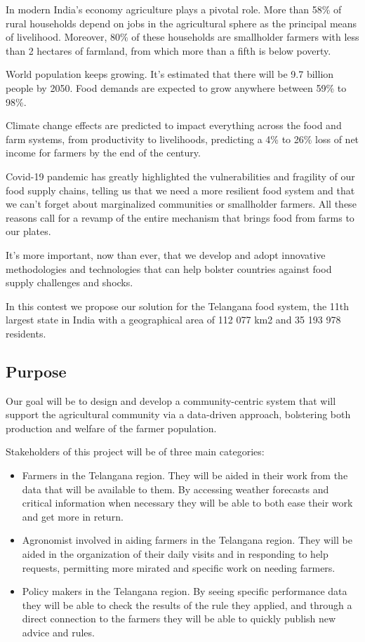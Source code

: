 \documentclass{article}
\begin{document}
In modern India’s economy agriculture plays a pivotal role. More than 58\% of rural households depend on jobs in the agricultural sphere as the principal means of livelihood. Moreover, 80\% of these households are smallholder farmers with less than 2 hectares of farmland, from which more than a fifth is below poverty. \par
World population keeps growing. It’s estimated that there will be 9.7 billion people by 2050. Food demands are expected to grow anywhere between 59\% to 98\%. \par
Climate change effects are predicted to impact everything across the food and farm systems, from productivity to livelihoods, predicting a 4\% to 26\% loss of net income for farmers by the end of the century. \par
Covid-19 pandemic has greatly highlighted the vulnerabilities and fragility of our food supply chains, telling us that we need a more resilient food system and that we can’t forget about marginalized communities or smallholder farmers.
All these reasons call for a revamp of the entire mechanism that brings food from farms to our plates. \par 
It’s more important, now than ever, that we develop and adopt innovative methodologies and technologies that can help bolster countries against food supply challenges and shocks. \par
In this contest we propose our solution for the Telangana food system, the 11th largest state in India with a geographical area of 112 077 km2 and 35 193 978 residents. 

\subsection{Purpose}
    Our goal will be to design and develop a community-centric system that will support the agricultural community via a data-driven approach, bolstering both production and welfare of the farmer population. \par
    Stakeholders of this project will be of three main categories:
    \begin{itemize}
        \item Farmers in the Telangana region. They will be aided in their work from the data that will be available to them. By accessing weather forecasts and critical information when necessary they will be able to both ease their work and get more in return.
        \item Agronomist involved in aiding farmers in the Telangana region. They will be aided in the organization of their daily visits and in responding to help requests, permitting more mirated and specific work on needing farmers.
        \item Policy makers in the Telangana region. By seeing specific performance data they will be able to check the results of the rule they applied, and through a direct connection to the farmers they will be able to quickly publish new advice and rules.
    \end{itemize}
\end{document}
